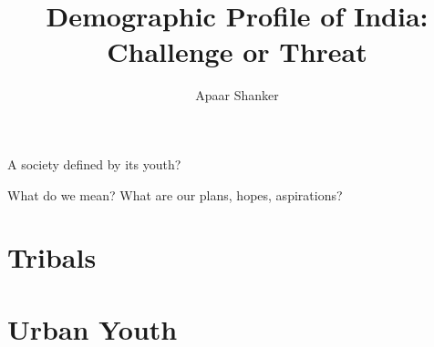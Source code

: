 \documentclass[10pt,a4paper]{article}
\author{Apaar Shanker}
\title{Demographic Profile of India: Challenge or Threat}
\begin{document}
A society defined by its youth?

What do we mean? What are our plans, hopes, aspirations?


\section*{Tribals}
\section*{Urban Youth}
\end{document}

